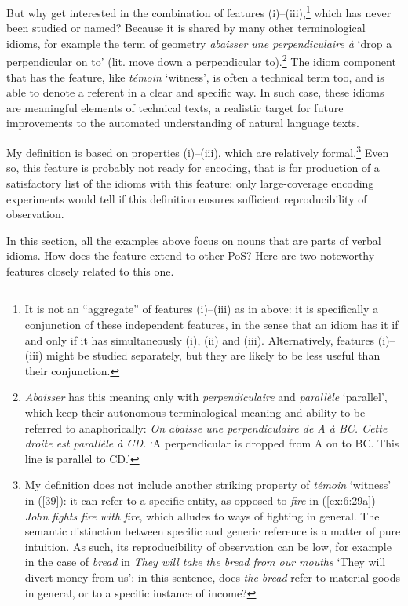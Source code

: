 \documentclass[output=paper]{langsci/langscibook}
\begin{document}
But why get interested in the combination of features (i)--(iii),\footnote{It 
  is not an “aggregate” of features (i)--(iii) as in  above: it is specifically a conjunction of these independent features, in the sense that an idiom has it if and only if it has simultaneously (i), (ii) and (iii). Alternatively, features (i)--(iii) might be studied separately, but they are likely to be less useful than their conjunction.
} which has never been studied or named? Because it is shared by many other terminological idioms, for example the  term of geometry \textit{abaisser une perpendiculaire à} ‘drop a perpendicular on to’ (lit. move down a perpendicular to).\footnote{\textit{Abaisser} has this meaning only with \textit{perpendiculaire} and \textit{parallèle} ‘parallel’, which keep their autonomous terminological meaning and ability to be referred to anaphorically:  
\ea \textit{On abaisse une perpendiculaire de A à BC. Cette droite est parallèle à CD.}  
\glt ‘A perpendicular is dropped from A on to BC. This line is parallel to CD.’
\zlast
}
The idiom component that has the feature, like \textit{témoin} ‘witness’, is often a technical term too, and is able to denote a referent in a clear and specific way. In such case, these idioms are meaningful elements of technical texts, a realistic target for future improvements to the automated understanding of natural language texts.

My definition is based on properties (i)--(iii), which are relatively formal.\footnote{My definition does not include another striking property of \textit{témoin} ‘witness’ in (\ref{39}): it can refer to a specific entity, as opposed to \textit{fire} in (\ref{ex:6:29a}) \textit{John fights fire with fire}, which alludes to ways of fighting in general. The semantic distinction between specific and generic reference is a matter of pure intuition. As such, its reproducibility of observation can be low, for example in the case of \textit{bread} in \textit{They will take the bread from our mouths} ‘They will divert money from us’: in this sentence, does \textit{the bread} refer to material goods in general, or to a specific instance of income?} Even so, this feature is probably not ready for encoding, that is for production of a satisfactory list of the idioms with this feature: only large-coverage encoding experiments would tell if this definition ensures sufficient reproducibility of observation.

In this section, all the examples above focus on nouns that are parts of verbal idioms. How does the feature extend to other PoS? Here are two noteworthy features closely related to this one. 
\end{document}
